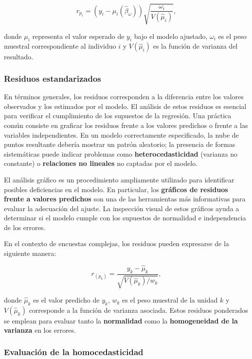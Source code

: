 \documentclass[
  12pt,
]{book}
\begin{document}
\[
r_{p_{i}} = \left(y_{i} - \mu_{i}(\hat{\beta}_{\omega})\right) \sqrt{\frac{\omega_{i}}{V(\hat{\mu}_{i})}},
\]

donde \(\mu_{i}\) representa el valor esperado de \(y_{i}\) bajo el modelo ajustado, \(\omega_{i}\) es el peso muestral correspondiente al individuo \(i\) y \(V(\hat{\mu}_{i})\) es la función de varianza del resultado.

\subsubsection{Residuos estandarizados}\label{residuos-estandarizados}

En términos generales, los residuos corresponden a la diferencia entre los valores observados y los estimados por el modelo. El análisis de estos residuos es esencial para verificar el cumplimiento de los supuestos de la regresión. Una práctica común consiste en graficar los residuos frente a los valores predichos o frente a las variables independientes. En un modelo correctamente especificado, la nube de puntos resultante debería mostrar un patrón aleatorio; la presencia de formas sistemáticas puede indicar problemas como \textbf{heterocedasticidad} (varianza no constante) o \textbf{relaciones no lineales} no captadas por el modelo.

El análisis gráfico es un procedimiento ampliamente utilizado para identificar posibles deficiencias en el modelo. En particular, los \textbf{gráficos de residuos frente a valores predichos} son una de las herramientas más informativas para evaluar la adecuación del ajuste. La inspección visual de estos gráficos ayuda a determinar si el modelo cumple con los supuestos de normalidad e independencia de los errores.

En el contexto de encuestas complejas, los residuos pueden expresarse de la siguiente manera:

\[
r_{(p_k)} = \frac{y_k - \hat{\mu}_k}{\sqrt{V(\hat{\mu}_k)/w_k}},
\]

donde \(\hat{\mu}_k\) es el valor predicho de \(y_k\), \(w_k\) es el peso muestral de la unidad \(k\) y \(V(\hat{\mu}_k)\) corresponde a la función de varianza asociada. Estos residuos ponderados se emplean para evaluar tanto la \textbf{normalidad} como la \textbf{homogeneidad de la varianza} en los errores.

\subsubsection{Evaluación de la homocedasticidad}\label{evaluaciuxf3n-de-la-homocedasticidad}
\end{document}
